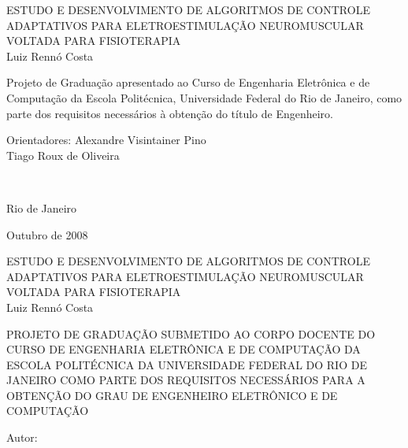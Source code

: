 

\begin{center}
\large{ESTUDO E DESENVOLVIMENTO DE ALGORITMOS DE CONTROLE ADAPTATIVOS PARA ELETROESTIMULAÇÃO NEUROMUSCULAR VOLTADA PARA FISIOTERAPIA}\\
   \vspace{2cm}
\large{Luiz Rennó Costa}\\
\end{center}
   \vspace{3cm}
\hspace{7cm}
\hfill \parbox{8.0cm}{Projeto de Graduação apresentado ao Curso de Engenharia Eletrônica e de Computação da Escola Politécnica, Universidade Federal do Rio de Janeiro, como parte dos requisitos necessários à obtenção do título de Engenheiro.\\}
   \vspace{2cm}
\hfill \parbox{8.0cm}{Orientadores: Alexandre Visintainer Pino \\ Tiago Roux de Oliveira} \\
   \vspace{2cm}
\begin{center}
Rio de Janeiro

Outubro de 2008
\end{center}




\pagebreak


\begin{center}
\large{ESTUDO E DESENVOLVIMENTO DE ALGORITMOS DE CONTROLE ADAPTATIVOS PARA ELETROESTIMULAÇÃO NEUROMUSCULAR VOLTADA PARA FISIOTERAPIA}\\
   \vspace{1cm}
\large{Luiz Rennó Costa}\\
\end{center}
   \vspace{2cm}
PROJETO DE GRADUAÇÃO SUBMETIDO AO CORPO DOCENTE DO CURSO DE ENGENHARIA ELETRÔNICA E DE COMPUTAÇÃO DA ESCOLA POLITÉCNICA DA UNIVERSIDADE FEDERAL DO RIO DE JANEIRO COMO PARTE DOS REQUISITOS NECESSÁRIOS PARA A OBTENÇÃO DO GRAU DE ENGENHEIRO ELETRÔNICO E DE COMPUTAÇÃO   
   
   \vspace{1cm}
Autor:
      \vspace{0.5cm}
      \begin{flushright}
         \parbox{10cm}{
            \hrulefill

            \vspace{-.375cm}

            \vspace{0.1cm}
         }
      \end{flushright}
      
